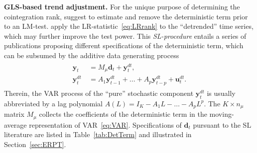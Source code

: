 \textbf{GLS-based trend adjustment.} For the unique purpose of determining the cointegration rank, \citet{SaikkonenLutkepohl2000a} suggest to estimate and remove the deterministic term prior to an LM-test. \citet{SaikkonenLutkepohl2000c} apply the LR-statistic~\eqref{eq:LRrank} to the ``detrended'' time series, which may further improve the test power. This \textit{SL-procedure} entails a series of publications proposing different specifications of the deterministic term, which can be subsumed by the additive data generating process 
\begin{align} \label{eq:addDGP}
\begin{split}
	\boldsymbol{y}_{t} \ & = M_\mu \boldsymbol{d}_t + \boldsymbol{y}^{d \! t}_{t}, \\
	\boldsymbol{y}^{d \! t}_{t} \ & = A_{1} \boldsymbol{y}^{d \! t}_{t-1} + ... + A_{p} \boldsymbol{y}^{d \! t}_{t-p} + \boldsymbol{u}^{d \! t}_{t}.
\end{split}
\end{align}
Therein, the VAR process of the ``pure'' stochastic component $ \boldsymbol{y}^{d \! t}_{t} $ is usually abbreviated by a lag polynomial $ A(L) = I_K - A_1 L - \ldots - A_p L^p $. The $ K \times n_\mu $ matrix $ M_\mu $ collects the coefficients of the deterministic term in the moving-average representation of VAR~\eqref{eq:VAR}. Specifications of $ \boldsymbol{d}_t $ pursuant to the SL literature are listed in Table~\ref{tab:DetTerm} and illustrated in Section~\ref{sec:ERPT}.

